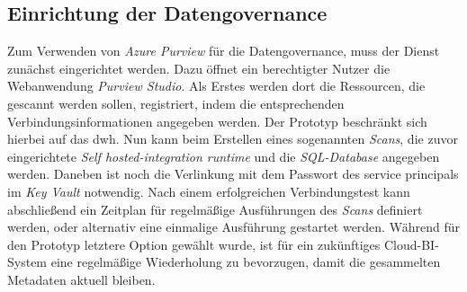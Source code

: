 \subsection{Einrichtung der Datengovernance} \label{sec:praktischeUmsetzung:purviewDatengovernance}
Zum Verwenden von \textit{Azure Purview} für die Datengovernance, muss der Dienst zunächst eingerichtet werden. Dazu öffnet ein berechtigter Nutzer die Webanwendung \textit{Purview Studio}. Als Erstes werden dort die Ressourcen, die gescannt werden sollen, registriert, indem die entsprechenden Verbindungsinformationen angegeben werden. Der Prototyp beschränkt sich hierbei auf das \ac{dwh}. Nun kann beim Erstellen eines sogenannten \textit{Scans}, die zuvor eingerichtete \textit{Self hosted-integration runtime} und die \textit{SQL-Database} angegeben werden. Daneben ist noch die Verlinkung mit dem Passwort des service principals im \textit{Key Vault} notwendig. Nach einem erfolgreichen Verbindungstest kann abschließend ein Zeitplan für regelmäßige Ausführungen des \textit{Scans} definiert werden, oder alternativ eine einmalige Ausführung gestartet werden. Während für den Prototyp letztere Option gewählt wurde, ist für ein zukünftiges Cloud-BI-System eine regelmäßige Wiederholung zu bevorzugen, damit die gesammelten Metadaten aktuell bleiben. 

